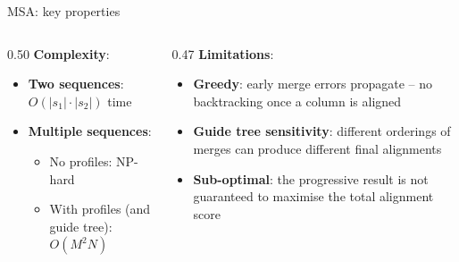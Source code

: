 \documentclass[aspectratio=169,t]{beamer}
\begin{document}
\begin{frame}[shrink=5]{MSA: key properties}
  \vspace{0.6cm}
  \begin{columns}[c]
    \begin{column}{0.50\textwidth}
      \textbf{Complexity}:
      \begin{itemize}
        \item \textbf{Two sequences}: $O(|s_1| \cdot |s_2|)$ time
        \item \textbf{Multiple sequences}:
        \begin{itemize}
          \item No profiles: NP-hard
          \item With profiles (and guide tree): $O(M^2 N)$
        \end{itemize}
      \end{itemize}
      \vspace{0.25cm}
    \end{column}
    \begin{column}{0.47\textwidth}
      \textbf{Limitations}:
      \begin{itemize}
        \item \textbf{Greedy}: early merge errors propagate -- no backtracking once a column is aligned
        \item \textbf{Guide tree sensitivity}: different orderings of merges can produce different final alignments
        \item \textbf{Sub-optimal}: the progressive result is not guaranteed to maximise the total alignment score
      \end{itemize}
    \end{column}
  \end{columns}
\end{frame}

\end{document}
